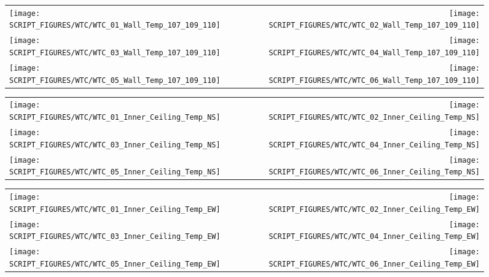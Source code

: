 \begin{figure}[!ht]
\begin{tabular*}{\textwidth}{l@{\extracolsep{\fill}}r}
\texttt{[image: SCRIPT\_FIGURES/WTC/WTC\_01\_Wall\_Temp\_107\_109\_110]} &
\texttt{[image: SCRIPT\_FIGURES/WTC/WTC\_02\_Wall\_Temp\_107\_109\_110]} \\
\texttt{[image: SCRIPT\_FIGURES/WTC/WTC\_03\_Wall\_Temp\_107\_109\_110]} &
\texttt{[image: SCRIPT\_FIGURES/WTC/WTC\_04\_Wall\_Temp\_107\_109\_110]} \\
\texttt{[image: SCRIPT\_FIGURES/WTC/WTC\_05\_Wall\_Temp\_107\_109\_110]} &
\texttt{[image: SCRIPT\_FIGURES/WTC/WTC\_06\_Wall\_Temp\_107\_109\_110]}
\end{tabular*}
\label{NIST_WTC_Wall_107_109_110}
\end{figure}

\begin{figure}[!ht]
\begin{tabular*}{\textwidth}{l@{\extracolsep{\fill}}r}
\texttt{[image: SCRIPT\_FIGURES/WTC/WTC\_01\_Inner\_Ceiling\_Temp\_NS]} &
\texttt{[image: SCRIPT\_FIGURES/WTC/WTC\_02\_Inner\_Ceiling\_Temp\_NS]} \\
\texttt{[image: SCRIPT\_FIGURES/WTC/WTC\_03\_Inner\_Ceiling\_Temp\_NS]} &
\texttt{[image: SCRIPT\_FIGURES/WTC/WTC\_04\_Inner\_Ceiling\_Temp\_NS]} \\
\texttt{[image: SCRIPT\_FIGURES/WTC/WTC\_05\_Inner\_Ceiling\_Temp\_NS]} &
\texttt{[image: SCRIPT\_FIGURES/WTC/WTC\_06\_Inner\_Ceiling\_Temp\_NS]}
\end{tabular*}
\label{NIST_WTC_Inner_Ceiling_NS}
\end{figure}

\begin{figure}[!ht]
\begin{tabular*}{\textwidth}{l@{\extracolsep{\fill}}r}
\texttt{[image: SCRIPT\_FIGURES/WTC/WTC\_01\_Inner\_Ceiling\_Temp\_EW]} &
\texttt{[image: SCRIPT\_FIGURES/WTC/WTC\_02\_Inner\_Ceiling\_Temp\_EW]} \\
\texttt{[image: SCRIPT\_FIGURES/WTC/WTC\_03\_Inner\_Ceiling\_Temp\_EW]} &
\texttt{[image: SCRIPT\_FIGURES/WTC/WTC\_04\_Inner\_Ceiling\_Temp\_EW]} \\
\texttt{[image: SCRIPT\_FIGURES/WTC/WTC\_05\_Inner\_Ceiling\_Temp\_EW]} &
\texttt{[image: SCRIPT\_FIGURES/WTC/WTC\_06\_Inner\_Ceiling\_Temp\_EW]}
\end{tabular*}
\label{NIST_WTC_Inner_Ceiling_EW}
\end{figure}

